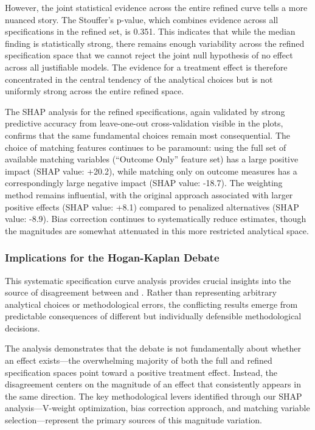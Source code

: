 However, the joint statistical evidence across the entire refined curve tells a more nuanced story. The Stouffer's p-value, which combines evidence across all specifications in the refined set, is 0.351. This indicates that while the median finding is statistically strong, there remains enough variability across the refined specification space that we cannot reject the joint null hypothesis of no effect across all justifiable models. The evidence for a treatment effect is therefore concentrated in the central tendency of the analytical choices but is not uniformly strong across the entire refined space.

The SHAP analysis for the refined specifications, again validated by strong predictive accuracy from leave-one-out cross-validation visible in the plots, confirms that the same fundamental choices remain most consequential. The choice of matching features continues to be paramount: using the full set of available matching variables (``Outcome Only'' feature set) has a large positive impact (SHAP value: +20.2), while matching only on outcome measures has a correspondingly large negative impact (SHAP value: -18.7). The weighting method remains influential, with the original approach associated with larger positive effects (SHAP value: +8.1) compared to penalized alternatives (SHAP value: -8.9). Bias correction continues to systematically reduce estimates, though the magnitudes are somewhat attenuated in this more restricted analytical space.

\subsubsection{Implications for the Hogan-Kaplan Debate}

This systematic specification curve analysis provides crucial insights into the source of disagreement between \citet{hogan2022prosecution} and \citet{kaplan2022prosecution}. Rather than representing arbitrary analytical choices or methodological errors, the conflicting results emerge from predictable consequences of different but individually defensible methodological decisions.

The analysis demonstrates that the debate is not fundamentally about whether an effect exists—the overwhelming majority of both the full and refined specification spaces point toward a positive treatment effect. Instead, the disagreement centers on the magnitude of an effect that consistently appears in the same direction. The key methodological levers identified through our SHAP analysis—V-weight optimization, bias correction approach, and matching variable selection—represent the primary sources of this magnitude variation.

